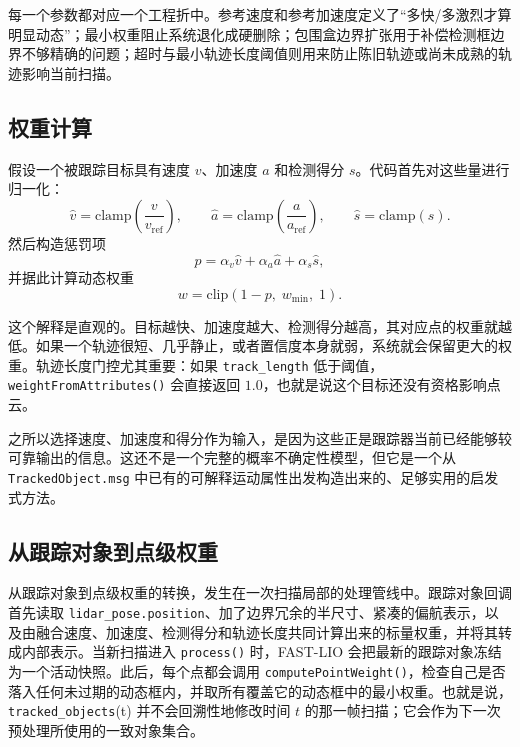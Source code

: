 \documentclass[utf8, a4paper, 12pt]{ctexart}
\begin{document}
每一个参数都对应一个工程折中。参考速度和参考加速度定义了“多快/多激烈才算明显动态”；最小权重阻止系统退化成硬删除；包围盒边界扩张用于补偿检测框边界不够精确的问题；超时与最小轨迹长度阈值则用来防止陈旧轨迹或尚未成熟的轨迹影响当前扫描。

\subsection{权重计算}
假设一个被跟踪目标具有速度 \(v\)、加速度 \(a\) 和检测得分 \(s\)。代码首先对这些量进行归一化：
\begin{equation}
\hat{v}=\mathrm{clamp}\!\left(\frac{v}{v_{\mathrm{ref}}}\right), \qquad
\hat{a}=\mathrm{clamp}\!\left(\frac{a}{a_{\mathrm{ref}}}\right), \qquad
\hat{s}=\mathrm{clamp}(s).
\end{equation}
然后构造惩罚项
\begin{equation}
p = \alpha_v \hat{v} + \alpha_a \hat{a} + \alpha_s \hat{s},
\end{equation}
并据此计算动态权重
\begin{equation}
w = \mathrm{clip}(1-p,\; w_{\min},\; 1).
\end{equation}

这个解释是直观的。目标越快、加速度越大、检测得分越高，其对应点的权重就越低。如果一个轨迹很短、几乎静止，或者置信度本身就弱，系统就会保留更大的权重。轨迹长度门控尤其重要：如果 \texttt{track\_length} 低于阈值，\texttt{weightFromAttributes()} 会直接返回 \(1.0\)，也就是说这个目标还没有资格影响点云。

之所以选择速度、加速度和得分作为输入，是因为这些正是跟踪器当前已经能够较可靠输出的信息。这还不是一个完整的概率不确定性模型，但它是一个从 \texttt{TrackedObject.msg} 中已有的可解释运动属性出发构造出来的、足够实用的启发式方法。

\subsection{从跟踪对象到点级权重}
从跟踪对象到点级权重的转换，发生在一次扫描局部的处理管线中。跟踪对象回调首先读取 \texttt{lidar\_pose.position}、加了边界冗余的半尺寸、紧凑的偏航表示，以及由融合速度、加速度、检测得分和轨迹长度共同计算出来的标量权重，并将其转成内部表示。当新扫描进入 \texttt{process()} 时，FAST-LIO 会把最新的跟踪对象冻结为一个活动快照。此后，每个点都会调用 \texttt{computePointWeight()}，检查自己是否落入任何未过期的动态框内，并取所有覆盖它的动态框中的最小权重。也就是说，\texttt{tracked\_objects}(t) 并不会回溯性地修改时间 \(t\) 的那一帧扫描；它会作为下一次预处理所使用的一致对象集合。
\end{document}
